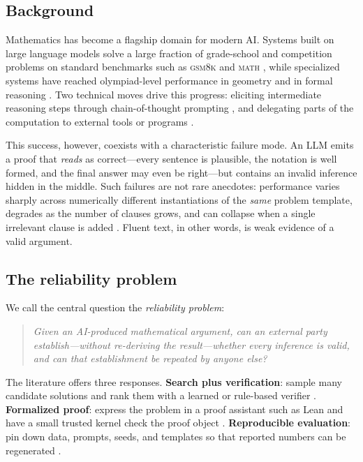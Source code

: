 \documentclass[11pt,a4paper]{article}
\theoremstyle{plain}
\theoremstyle{definition}
\theoremstyle{remark}
\begin{document}
\subsection{Background}
Mathematics has become a flagship domain for modern AI. Systems built on
large language models solve a large fraction of grade-school and
competition problems on standard benchmarks such as \textsc{gsm8k}
\citep{cobbe2021gsm8k} and \textsc{math} \citep{hendrycks2021math}, while
specialized systems have reached olympiad-level performance in geometry
\citep{trinh2024alphageometry,chervonyi2025alphageometry2} and in formal
reasoning \citep{hubert2025alphaproof}. Two technical moves drive this
progress: eliciting intermediate reasoning steps through chain-of-thought
prompting \citep{wei2022cot}, and delegating parts of the computation to
external tools or programs \citep{chen2023pot,schick2023toolformer}.

This success, however, coexists with a characteristic failure mode. An LLM
emits a proof that \emph{reads} as correct---every sentence is plausible,
the notation is well formed, and the final answer may even be right---but
contains an invalid inference hidden in the middle. Such failures are not
rare anecdotes: performance varies sharply across numerically different
instantiations of the \emph{same} problem template, degrades as the number
of clauses grows, and can collapse when a single irrelevant clause is added
\citep{mirzadeh2024gsmsymbolic}. Fluent text, in other words, is weak
evidence of a valid argument.

\subsection{The reliability problem}
We call the central question the \emph{reliability problem}:
\begin{quote}
\itshape Given an AI-produced mathematical argument, can an external party
establish---without re-deriving the result---whether every inference is
valid, and can that establishment be repeated by anyone else?
\end{quote}
The literature offers three responses. \textbf{Search plus verification}:
sample many candidate solutions and rank them with a learned or
rule-based verifier \citep{cobbe2021gsm8k,wang2023selfconsistency,
lightman2024verify}. \textbf{Formalized proof}: express the problem in a
proof assistant such as Lean and have a small trusted kernel check the
proof object \citep{polu2020gptf,first2023baldur,xin2024deepseekprover,
hubert2025alphaproof}. \textbf{Reproducible evaluation}: pin down data,
prompts, seeds, and templates so that reported numbers can be regenerated
\citep{zheng2022minif2f,yang2023leandojo,mirzadeh2024gsmsymbolic}.
\end{document}
